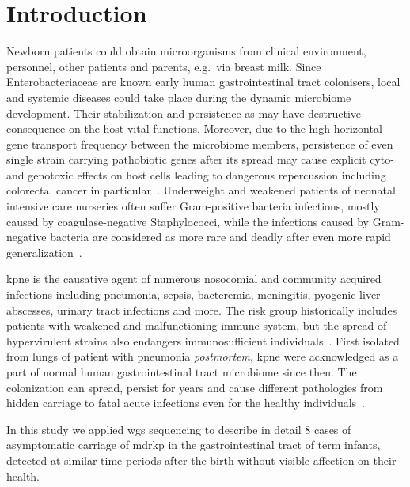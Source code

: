 \section{Introduction}\label{sec:intro}
Newborn patients could obtain microorganisms from clinical environment, personnel, other patients and parents,
e.g.\ via breast milk.
Since Enterobacteriaceae are known early human gastrointestinal tract colonisers, local and systemic diseases could take
place during the dynamic microbiome development.
Their stabilization and persistence as may have destructive consequence on the host vital functions.
Moreover, due to the high horizontal gene transport frequency between the microbiome members, persistence of even single
strain carrying pathobiotic genes after its spread may cause explicit cyto- and genotoxic effects on host cells
leading to dangerous repercussion including colorectal cancer in particular~\cite{Pope2019}.
Underweight and weakened patients of neonatal intensive care nurseries often suffer Gram-positive bacteria infections,
mostly caused by coagulase-negative Staphylococci, while the infections caused by Gram-negative bacteria are considered
as more rare and deadly after even more rapid generalization~\cite{Dorota2017}.

\gls{kpne} is the causative agent of numerous nosocomial and community acquired infections including
pneumonia, sepsis, bacteremia, meningitis, pyogenic liver abscesses, urinary tract infections and more.
The risk group historically includes patients with weakened and malfunctioning immune system, but the spread of
hypervirulent strains also endangers immunosufficient individuals~\cite{Shankar2018}.
First isolated from lungs of patient with pneumonia \textit{postmortem}, \gls{kpne} were acknowledged as a part of
normal human gastrointestinal tract microbiome since then.
The colonization can spread, persist for years and cause different pathologies from hidden carriage to
fatal acute infections even for the healthy individuals~\cite{Martin2018}.

In this study we applied \gls{wgs} sequencing to describe in detail 8 cases of asymptomatic carriage of \gls{mdrkp}
in the gastrointestinal tract of term infants, detected at similar time periods after the birth
without visible affection on their health.
